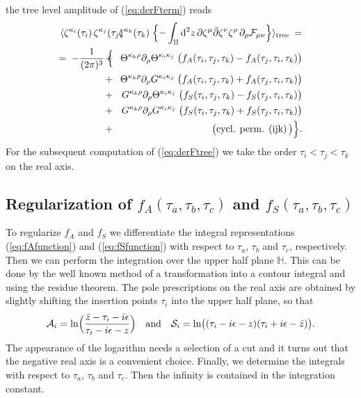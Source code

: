 \documentclass[a4paper,12pt]{article}
\let\bra=\langle        \let\ket=\rangle
\newcommand {\ud} {\mathrm{d}}
\newcommand {\cF} {{\cal F}}
\newcommand {\cA}{{\cal A}}
\newcommand {\cS}{{\cal S}}
\newcommand {\bbH}{\mathbb{H}}
\newcommand {\back}{\!\!\!\!\!\!\!\!\!\!\!\!}
\newcommand {\Back}{\!\!\!\!\!}
\begin{document}
the tree level amplitude of (\ref{eq:derFterm}) reads
\begin{eqnarray}
  \label{eq:derFtree}
  \bra \zeta^{\kappa_i}(\tau_i) \, \zeta^{\kappa_j}(\tau_j) \,
      \back& &\Back \hspace{4.5pt} \zeta^{\kappa_k}(\tau_k) \; 
      \Bigl\{ - \int _\bbH \ud^2z \, 
              \partial \zeta^\mu \bar\partial \zeta^\nu \zeta^\rho \, 
              \partial_\rho \cF_{\mu\nu}
      \Bigr\} \ket_{\mathrm{tree}} \; = \nonumber \\
  = \; - \frac{1}{(2 \pi)^3} \; \Bigl\{
  \Back &+& \Back
      \Theta^{\kappa_k \rho} \partial_\rho \Theta^{\kappa_i\kappa_j}
      \;\bigl(f_A(\tau_i,\tau_j,\tau_k) - f_A(\tau_j,\tau_i,\tau_k)\bigr)
      \nonumber \\
  \Back &+& \Back
      \Theta^{\kappa_k \rho} \partial_\rho G^{\kappa_i\kappa_j}
      \;\bigl(f_A(\tau_i,\tau_j,\tau_k) + f_A(\tau_j,\tau_i,\tau_k)\bigr)
      \nonumber \\
  \Back &+& \Back
      G^{\kappa_k \rho} \partial_\rho \Theta^{\kappa_i\kappa_j}
      \;\bigl(f_S(\tau_i,\tau_j,\tau_k) - f_S(\tau_j,\tau_i,\tau_k)\bigr)
      \nonumber \\
  \Back &+& \Back
       G^{\kappa_k \rho} \partial_\rho G^{\kappa_i\kappa_j}
      \;\bigl(f_S(\tau_i,\tau_j,\tau_k) + f_S(\tau_j,\tau_i,\tau_k)\bigr)
      \nonumber \\
  \Back &+& \Back
      \bigl(\textrm{cycl. perm. (ijk)} \, \bigr) \Bigr\} .
\end{eqnarray}
For the subsequent computation of (\ref{eq:derFtree}) we take the order
$\tau_i < \tau_j < \tau_k$ on the real axis.



\subsection{Regularization of $f_A(\tau_a,\tau_b,\tau_c)$ and 
                $f_S(\tau_a,\tau_b,\tau_c)$}

To regularize $f_A$ and $f_S$ we differentiate the integral representations
(\ref{eq:fAfunction}) and (\ref{eq:fSfunction}) with respect to 
$\tau_a$, $\tau_b$ and $\tau_c$, respectively. 
Then we can perform the integration over the
upper half plane $\bbH$. This can be done by the well known method of
a transformation into a contour integral and using the residue theorem.
The pole prescriptions on the real axis are obtained 
by slightly shifting the insertion points $\tau_i$ into the upper half plane, 
so that 
\begin{eqnarray}
  \label{eq:poles}
  \cA_i = \ln \Bigl(\frac{\bar z - \tau_i - i \epsilon}
                         {\tau_i - i \epsilon - z}\Bigr)
  \quad \textrm{and} \quad 
  \cS_i = \ln \bigl( (\tau_i - i \epsilon - z)
                     (\tau_i + i \epsilon - \bar z)\bigr)
  .
\end{eqnarray}
The appearance of the logarithm needs a selection of a cut and it turns out
that the negative real axis is a convenient choice.
Finally, we determine the integrals with
respect to $\tau_a$, $\tau_b$ and $\tau_c$. Then the infinity is
contained in the integration constant. 
\end{document}
